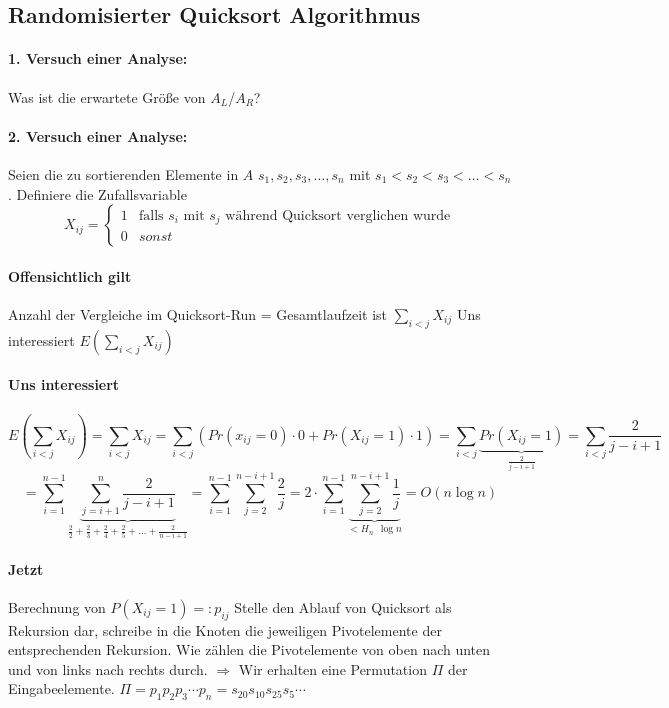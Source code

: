 \subsection{Randomisierter Quicksort Algorithmus}
\paragraph*{1. Versuch einer Analyse:} Was ist die erwartete Größe von $A_L$/$A_R$?

\paragraph*{2. Versuch einer Analyse:} Seien die zu sortierenden Elemente in $A$ $s_1,s_2,s_3,\dots,s_n$ mit $s_1<s_2<s_3<\dots<s_n$.
Definiere die Zufallsvariable
\begin{equation}
   X_{ij} =
   \begin{cases}
     1 & \text{falls } s_i \text{ mit } s_j \text{ während Quicksort verglichen wurde} \\
     0 & sonst
   \end{cases}
\end{equation}
\paragraph*{Offensichtlich gilt} Anzahl der Vergleiche im Quicksort-Run = Gesamtlaufzeit ist $\sum\limits_{i<j} X_{ij}$
Uns interessiert $E(\sum\limits_{i<j} X_{ij})$
\paragraph*{Uns interessiert} $$E(\sum\limits_{i<j} X_{ij})
= \sum\limits_{i<j} X_{ij} 
= \sum\limits_{i<j}(Pr(x_{ij}=0) \cdot 0 + Pr(X_{ij}=1) \cdot 1) 
= \sum\limits_{i<j} \underbrace{Pr(X_{ij}=1)}_{\frac{2}{j-i+1}} 
= \sum\limits_{i<j} \frac{2}{j-i+1}$$
$$= \sum\limits_{i=1}^{n-1} \underbrace{\sum\limits_{j=i+1}^n \frac{2}{j-i+1}}_{\frac{2}{2}+\frac{2}{3}+\frac{2}{4}+\frac{2}{5}+\dots+\frac{2}{n-i+1}} 
= \sum\limits_{i=1}^{n-1} \sum\limits_{j=2}^{n-i+1} \frac{2}{j}
= 2 \cdot \sum\limits_{i=1}^{n-1} \underbrace{\sum\limits_{j=2}^{n-i+1} \frac{1}{j}}_{<H_n~~\log n} 
= O(n \log n) $$ %

\paragraph*{Jetzt} Berechnung von $P(X_{ij}=1) =: p_{ij}$ Stelle den Ablauf von Quicksort als Rekursion dar, schreibe in die Knoten die jeweiligen Pivotelemente der entsprechenden Rekursion. Wie zählen die Pivotelemente von oben nach unten und von links nach rechts durch. $\Rightarrow$ Wir erhalten eine Permutation $\Pi$ der Eingabeelemente.
$\Pi = p_1 p_2 p_3 \cdots p_n = s_{20} s_{10} s_{25} s_{5} \cdots$
